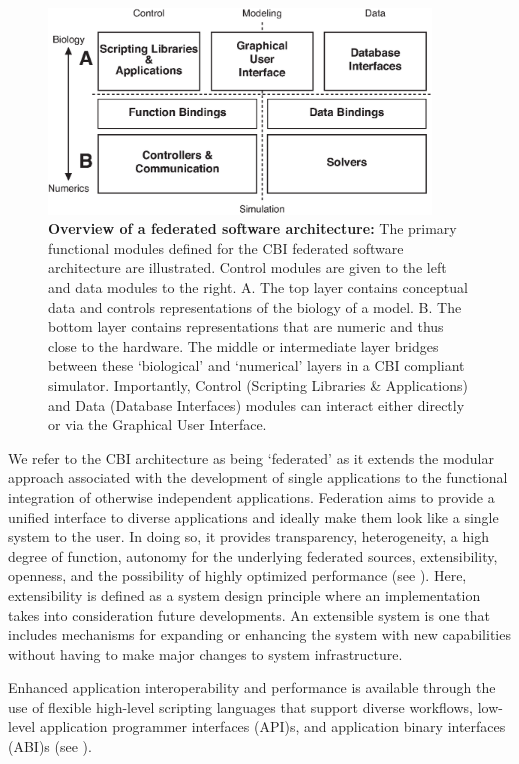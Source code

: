 \documentclass{article}
\begin{document}
\begin{figure}[ht]
\begin{center}
\includegraphics[width=4in]{figures/cbi-architecture-simple.eps}
\end{center}
\caption{ {\bf Overview of a federated software architecture:}
  The primary functional modules defined for
  the CBI federated software architecture are illustrated.  Control modules are given
  to the left and data modules to the right.  A. The top layer
  contains conceptual data and controls representations of the biology
  of a model. B. The bottom layer contains representations that are
  numeric and thus close to the hardware.  The middle or intermediate
  layer bridges between these `biological' and `numerical' layers in a
  CBI compliant simulator. Importantly, Control (Scripting Libraries
  \& Applications) and Data (Database Interfaces) modules can interact
  either directly or via the Graphical User Interface. }
\label{fig:cbi-architecture-simple}
\end{figure}

We refer to the CBI architecture as being `federated' as it extends
the modular approach associated with the development of single
applications to the functional integration of otherwise independent
applications.  Federation aims to provide a unified interface to
diverse applications and ideally make them look like a single
system to the user. In doing so, it provides transparency, heterogeneity, a high
degree of function, autonomy for the underlying federated sources,
extensibility, openness, and the possibility of highly optimized
performance (see \cite{federated-2002-xyz}). Here, extensibility is defined as a system design
principle where an implementation takes into consideration future
developments. An extensible system is one that includes mechanisms for
expanding or enhancing the system with new capabilities without having
to make major changes to system infrastructure. 

Enhanced application interoperability and performance is available
through the use of flexible high-level scripting languages that support
diverse workflows, low-level application programmer interfaces
(API)s, and application binary interfaces (ABI)s (see \cite{Cornelis:2011fk}).
\end{document}
